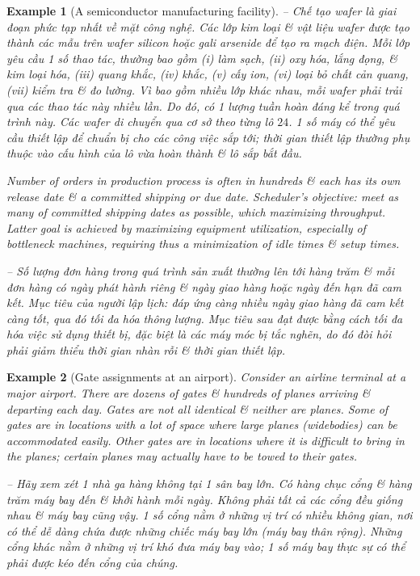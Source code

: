 \documentclass{article}
\newtheorem{example}{Example}
\begin{document}
\begin{itemize}
\begin{itemize}
\begin{example}[A semiconductor manufacturing facility]
            -- Chế tạo wafer là giai đoạn phức tạp nhất về mặt công nghệ. Các lớp kim loại \& vật liệu wafer được tạo thành các mẫu trên wafer silicon hoặc gali arsenide để tạo ra mạch điện. Mỗi lớp yêu cầu 1 số thao tác, thường bao gồm (i) làm sạch, (ii) oxy hóa, lắng đọng, \& kim loại hóa, (iii) quang khắc, (iv) khắc, (v) cấy ion, (vi) loại bỏ chất cản quang, (vii) kiểm tra \& đo lường. Vì bao gồm nhiều lớp khác nhau, mỗi wafer phải trải qua các thao tác này nhiều lần. Do đó, có 1 lượng tuần hoàn đáng kể trong quá trình này. Các wafer di chuyển qua cơ sở theo từng lô $24$. 1 số máy có thể yêu cầu thiết lập để chuẩn bị cho các công việc sắp tới; thời gian thiết lập thường phụ thuộc vào cấu hình của lô vừa hoàn thành \& lô sắp bắt đầu.

            Number of orders in production process is often in hundreds \& each has its own release date \& a committed shipping or due date. Scheduler's objective: meet as many of committed shipping dates as possible, which maximizing throughput. Latter goal is achieved by maximizing equipment utilization, especially of bottleneck machines, requiring thus a minimization of idle times \& setup times.

            -- Số lượng đơn hàng trong quá trình sản xuất thường lên tới hàng trăm \& mỗi đơn hàng có ngày phát hành riêng \& ngày giao hàng hoặc ngày đến hạn đã cam kết. Mục tiêu của người lập lịch: đáp ứng càng nhiều ngày giao hàng đã cam kết càng tốt, qua đó tối đa hóa thông lượng. Mục tiêu sau đạt được bằng cách tối đa hóa việc sử dụng thiết bị, đặc biệt là các máy móc bị tắc nghẽn, do đó đòi hỏi phải giảm thiểu thời gian nhàn rỗi \& thời gian thiết lập.
        \end{example}

        \begin{example}[Gate assignments at an airport]
            Consider an airline terminal at a major airport. There are dozens of gates \& hundreds of planes arriving \& departing each day. Gates are not all identical \& neither are planes. Some of gates are in locations with a lot of space where large planes (widebodies) can be accommodated easily. Other gates are in locations where it is difficult to bring in the planes; certain planes may actually have to be towed to their gates.

            -- Hãy xem xét 1 nhà ga hàng không tại 1 sân bay lớn. Có hàng chục cổng \& hàng trăm máy bay đến \& khởi hành mỗi ngày. Không phải tất cả các cổng đều giống nhau \& máy bay cũng vậy. 1 số cổng nằm ở những vị trí có nhiều không gian, nơi có thể dễ dàng chứa được những chiếc máy bay lớn (máy bay thân rộng). Những cổng khác nằm ở những vị trí khó đưa máy bay vào; 1 số máy bay thực sự có thể phải được kéo đến cổng của chúng.


\end{example}
\end{itemize}
\end{itemize}
\end{document}

